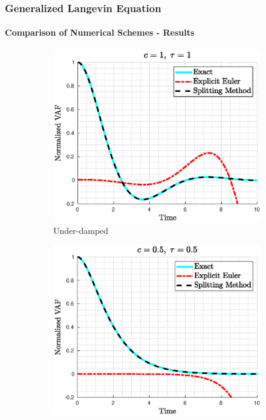 \documentclass[a4paper,10pt]{beamer}
\begin{document}
	\begin{frame}
		\footnotesize
		\frametitle{Generalized Langevin Equation}
		\framesubtitle{Comparison of Numerical Schemes - Results}
		\begin{figure}[H]
			\centering
			\begin{subfigure}[b]{0.326\linewidth}
				\includegraphics[width=\linewidth]{./Plots/CaseStudy/Underdamped.eps}
				\caption{Under-damped}
			\end{subfigure}
			\begin{subfigure}[b]{0.326\linewidth}
				\includegraphics[width=\linewidth]{./Plots/CaseStudy/Criticallydamped.eps}

\end{subfigure}
\end{figure}
\end{frame}
\end{document}
